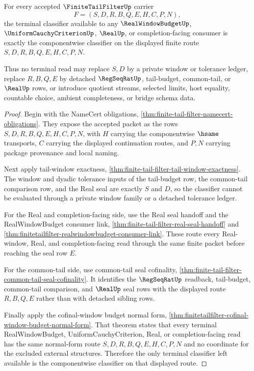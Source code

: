 \begin{theorem}
\label{thm:finite-tail-filter-terminal-classifier-exactness}
For every accepted $\FiniteTailFilterUp$ carrier
$$
F=(S,D,R,B,Q,E,H,C,P,N),
$$
the terminal classifier available to any $\RealWindowBudgetUp$, $\UniformCauchyCriterionUp$, $\RealUp$, or completion-facing consumer is exactly the componentwise classifier on the displayed finite route $S,D,R,B,Q,E,H,C,P,N$.

Thus no terminal read may replace $S,D$ by a private window or tolerance ledger, replace $R,B,Q,E$ by detached $\RegSeqRatUp$, tail-budget, common-tail, or $\RealUp$ rows, or introduce quotient streams, selected limits, host equality, countable choice, ambient completeness, or bridge schema data.
\end{theorem}
\begin{proof}
Begin with the NameCert obligations, \autoref{thm:finite-tail-filter-namecert-obligations}. They expose the accepted packet as the rows $S,D,R,B,Q,E,H,C,P,N$, with $H$ carrying the componentwise $\hsame$ transports, $C$ carrying the displayed continuation routes, and $P,N$ carrying package provenance and local naming.

Next apply tail-window exactness, \autoref{thm:finite-tail-filter-tail-window-exactness}. The window and dyadic tolerance inputs of the tail-budget row, the common-tail comparison row, and the Real seal are exactly $S$ and $D$, so the classifier cannot be evaluated through a private window family or a detached tolerance ledger.

For the Real and completion-facing side, use the Real seal handoff and the RealWindowBudget consumer link, \autoref{thm:finite-tail-filter-real-seal-handoff} and \autoref{thm:finitetailfilter-realwindowbudget-consumer-link}. These route every Real-window, Real, and completion-facing read through the same finite packet before reaching the seal row $E$.

For the common-tail side, use common-tail seal cofinality, \autoref{thm:finite-tail-filter-common-tail-seal-cofinality}. It identifies the $\RegSeqRatUp$ readback, tail-budget, common-tail comparison, and $\RealUp$ seal rows with the displayed route $R,B,Q,E$ rather than with detached sibling rows.

Finally apply the cofinal-window budget normal form, \autoref{thm:finitetailfilter-cofinal-window-budget-normal-form}. That theorem states that every terminal RealWindowBudget, UniformCauchyCriterion, Real, or completion-facing read has the same normal-form route $S,D,R,B,Q,E,H,C,P,N$ and no coordinate for the excluded external structures. Therefore the only terminal classifier left available is the componentwise classifier on that displayed route.
\end{proof}

